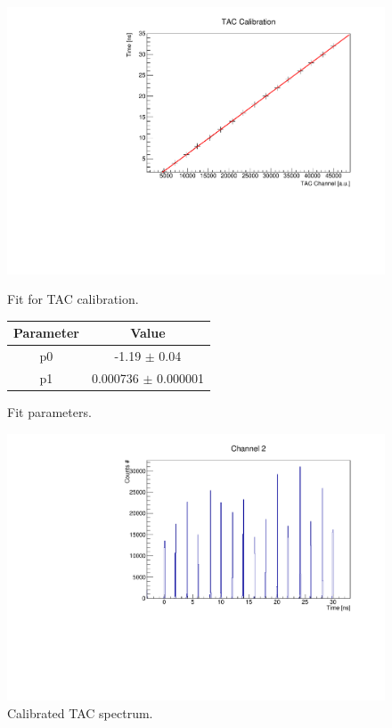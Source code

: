 \documentclass[a4paper,11pt]{article}
\begin{document}
\begin{figure}[h!]
\begin{minipage}[b]{0.6\textwidth}
\centering
\includegraphics[width=\textwidth]{fit_calibrazione_tac}
\caption{Fit for TAC calibration.}
\label{fig: fit tac}
\end{minipage}
\hfill
\begin{minipage}[b]{0.45\textwidth}
\centering
\begin{tabular}{cc}
\toprule
\toprule
Parameter & Value \\
\midrule
p0     & -1.19 $\pm$  0.04 \\
p1     &  0.000736   $\pm$  0.000001\\
\bottomrule
\bottomrule
\end{tabular}
\vspace{1.5cm}
\caption{Fit parameters.}
\end{minipage}

\end{figure}

\begin{figure}[h!]
\centering
\includegraphics[width=\textwidth]{tac_calibrato}
\caption{Calibrated TAC spectrum. }
\label{fig: calibrated TAC}
\end{figure}
\clearpage
\end{document}
